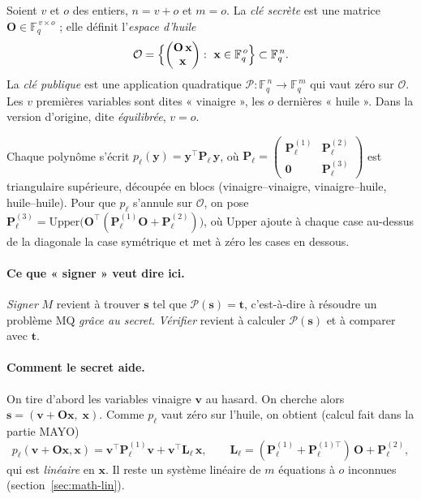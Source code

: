 \begin{definition}
Soient $v$ et $o$ des entiers, $n=v+o$ et $m=o$. La \emph{clé secrète} est une matrice $\mathbf{O}\in\mathbb{F}_q^{\,v\times o}$ ; elle définit l'\emph{espace d'huile}
\[\mathcal{O}=\Bigl\{\begin{pmatrix}\mathbf{O}\,\mathbf{x}\\ \mathbf{x}\end{pmatrix}:\ \mathbf{x}\in\mathbb{F}_q^{\,o}\Bigr\}\subset\mathbb{F}_q^{\,n}.\]
La \emph{clé publique} est une application quadratique $\mathcal{P}:\mathbb{F}_q^{\,n}\to\mathbb{F}_q^{\,m}$ qui vaut zéro sur $\mathcal{O}$. Les $v$ premières variables sont dites « vinaigre », les $o$ dernières « huile ». Dans la version d'origine, dite \emph{équilibrée}, $v=o$.
\end{definition}
Chaque polynôme s'écrit $p_\ell(\mathbf{y})=\mathbf{y}^{\top}\mathbf{P}_\ell\,\mathbf{y}$, où $\mathbf{P}_\ell=\begin{pmatrix}\mathbf{P}^{(1)}_\ell&\mathbf{P}^{(2)}_\ell\\\mathbf{0}&\mathbf{P}^{(3)}_\ell\end{pmatrix}$ est triangulaire supérieure, découpée en blocs (vinaigre--vinaigre, vinaigre--huile, huile--huile). Pour que $p_\ell$ s'annule sur $\mathcal{O}$, on pose $\mathbf{P}^{(3)}_\ell=\mathrm{Upper}\bigl(\mathbf{O}^{\top}(\mathbf{P}^{(1)}_\ell\mathbf{O}+\mathbf{P}^{(2)}_\ell)\bigr)$, où $\mathrm{Upper}$ ajoute à chaque case au-dessus de la diagonale la case symétrique et met à zéro les cases en dessous.

\paragraph{Ce que « signer » veut dire ici.} \emph{Signer} $M$ revient à trouver $\mathbf{s}$ tel que $\mathcal{P}(\mathbf{s})=\mathbf{t}$, c'est-à-dire à résoudre un problème MQ \emph{grâce au secret}. \emph{Vérifier} revient à calculer $\mathcal{P}(\mathbf{s})$ et à comparer avec $\mathbf{t}$.

\paragraph{Comment le secret aide.} On tire d'abord les variables vinaigre $\mathbf{v}$ au hasard. On cherche alors $\mathbf{s}=(\mathbf{v}+\mathbf{O}\mathbf{x},\;\mathbf{x})$. Comme $p_\ell$ vaut zéro sur l'huile, on obtient (calcul fait dans la partie MAYO)
\[p_\ell(\mathbf{v}+\mathbf{O}\mathbf{x},\mathbf{x})=\mathbf{v}^{\top}\mathbf{P}^{(1)}_\ell\mathbf{v}+\mathbf{v}^{\top}\mathbf{L}_\ell\,\mathbf{x},\qquad \mathbf{L}_\ell=(\mathbf{P}^{(1)}_\ell+\mathbf{P}^{(1)\top}_\ell)\,\mathbf{O}+\mathbf{P}^{(2)}_\ell,\]
qui est \emph{linéaire} en $\mathbf{x}$. Il reste un système linéaire de $m$ équations à $o$ inconnues (section~\ref{sec:math-lin}).

